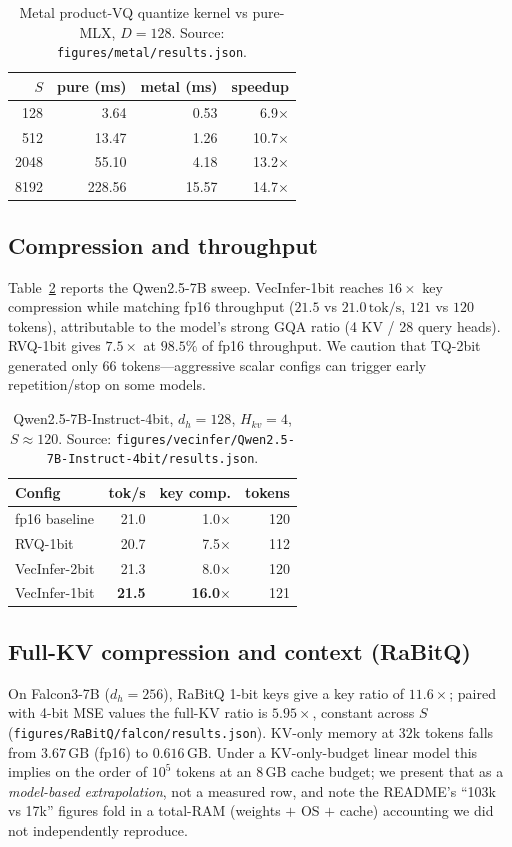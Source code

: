 \documentclass[11pt]{article}
\begin{document}
\begin{table}[t]
\centering\small
\caption{Metal product-VQ quantize kernel vs pure-MLX, $D{=}128$.
Source: \texttt{figures/metal/results.json}.}
\label{tab:metal}
\begin{tabular}{rrrr}
\toprule
$S$ & pure (ms) & metal (ms) & speedup \\
\midrule
128  & 3.64   & 0.53  & 6.9$\times$ \\
512  & 13.47  & 1.26  & 10.7$\times$ \\
2048 & 55.10  & 4.18  & 13.2$\times$ \\
8192 & 228.56 & 15.57 & 14.7$\times$ \\
\bottomrule
\end{tabular}
\end{table}

\subsection{Compression and throughput}
Table~\ref{tab:vecinfer} reports the Qwen2.5-7B sweep. VecInfer-1bit reaches
$16\times$ key compression while matching fp16 throughput ($21.5$ vs
$21.0\,\mathrm{tok/s}$, $121$ vs $120$ tokens), attributable to the model's
strong GQA ratio (4 KV / 28 query heads). RVQ-1bit gives $7.5\times$ at
$98.5\%$ of fp16 throughput. We caution that TQ-2bit generated only $66$
tokens---aggressive scalar configs can trigger early repetition/stop on some
models.

\begin{table}[t]
\centering\small
\caption{Qwen2.5-7B-Instruct-4bit, $d_h{=}128$, $H_{kv}{=}4$, $S\!\approx\!120$.
Source: \texttt{figures/vecinfer/Qwen2.5-7B-Instruct-4bit/results.json}.}
\label{tab:vecinfer}
\begin{tabular}{lrrr}
\toprule
Config & tok/s & key comp. & tokens \\
\midrule
fp16 baseline & 21.0 & 1.0$\times$ & 120 \\
RVQ-1bit      & 20.7 & 7.5$\times$ & 112 \\
VecInfer-2bit & 21.3 & 8.0$\times$ & 120 \\
VecInfer-1bit & \textbf{21.5} & \textbf{16.0$\times$} & 121 \\
\bottomrule
\end{tabular}
\end{table}

\subsection{Full-KV compression and context (RaBitQ)}
On Falcon3-7B ($d_h{=}256$), RaBitQ 1-bit keys give a key ratio of
$11.6\times$; paired with 4-bit MSE values the full-KV ratio is
$\mathbf{5.95\times}$, constant across $S$
(\texttt{figures/RaBitQ/falcon/results.json}). KV-only memory at $32\mathrm{k}$
tokens falls from $3.67\,\mathrm{GB}$ (fp16) to $0.616\,\mathrm{GB}$. Under a
KV-only-budget linear model this implies on the order of $10^5$ tokens at an
$8\,\mathrm{GB}$ cache budget; we present that as a \emph{model-based
extrapolation}, not a measured row, and note the README's ``103k vs 17k''
figures fold in a total-RAM (weights $+$ OS $+$ cache) accounting we did not
independently reproduce.
\end{document}

